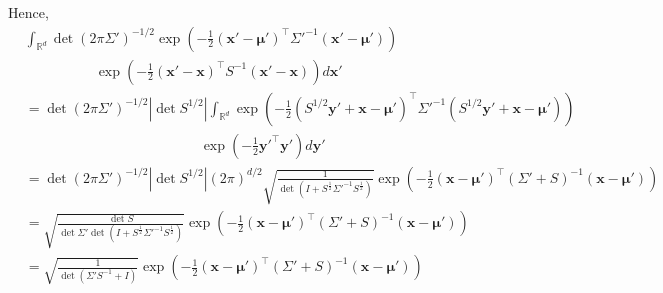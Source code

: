 \documentclass[oneside, 11pt]{article}
\begin{document}
    Hence, \begin{align*}
        &\int_{\mathbb{R}^d} \det(2\pi\Sigma')^{-1/2} \exp\left(-\frac12 \left(\mathbf{x}'-\bm{\mu}'\right)^\top \Sigma'^{-1} \left(\mathbf{x'}-\bm{\mu}'\right) \right) \\
        &\hspace{60pt}\exp\left(-\frac12 \left(\mathbf{x}'-\mathbf{x}\right)^\top S^{-1} \left(\mathbf{x}'-\mathbf{x}\right) \right) d\mathbf{x}' \\
        &= \det(2\pi\Sigma')^{-1/2} \left|\det S^{1/2}\right| \int_{\mathbb{R}^d} \exp\left(-\frac12 \left(S^{1/2} \mathbf{y}' + \mathbf{x} - \bm{\mu}'\right)^\top \Sigma'^{-1} \left(S^{1/2} \mathbf{y}' + \mathbf{x} - \bm{\mu}'\right) \right) \\
        &\hspace{150pt}\exp\left(-\frac12 \mathbf{y}'^\top \mathbf{y}' \right)  d\mathbf{y}' \\
        &= \det(2\pi\Sigma')^{-1/2} \left|\det S^{1/2}\right| (2 \pi)^{d/2} \sqrt{\frac{1}{\det\left(I + S^{\frac12}\Sigma'^{-1}S^{\frac12}\right)}} \exp\left(-\frac{1}{2}\left(\mathbf{x} - \bm{\mu}'\right)^\top \left(\Sigma' + S\right)^{-1}\left(\mathbf{x} - \bm{\mu}'\right)\right) \\
        &=  \sqrt{\frac{\det S}{\det\Sigma'\det\left(I + S^{\frac12}\Sigma'^{-1}S^{\frac12}\right)}} \exp\left(-\frac{1}{2}\left(\mathbf{x} - \bm{\mu}'\right)^\top \left(\Sigma' + S\right)^{-1}\left(\mathbf{x} - \bm{\mu}'\right)\right) \\
        &=  \sqrt{\frac{1}{\det\left(\Sigma'S^{-1} + I\right)}} \exp\left(-\frac{1}{2}\left(\mathbf{x} - \bm{\mu}'\right)^\top \left(\Sigma' + S\right)^{-1}\left(\mathbf{x} - \bm{\mu}'\right)\right)
    \end{align*}
\end{document}
